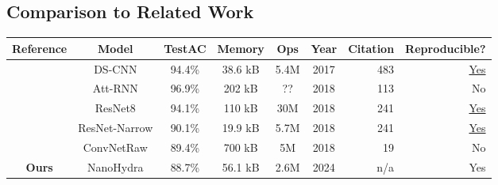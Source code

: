 \subsection{Comparison to Related Work}
\begin{table}
\begin{tabular}{||c|c|c|c|c|c|r|r||}
    \hline
    Reference & Model & TestAC & Memory & Ops & Year & Citation & Reproducible? \\

    \hline\hline
    \cite{Zhang2017}   &        DS-CNN & 94.4\% & 38.6 kB & 5.4M & 2017 & 483 &  \href{https://github.com/ARM-software/ML-KWS-for-MCU}{Yes} \\
    \cite{Andrade2018} &       Att-RNN & 96.9\% &  202 kB &   ?? & 2018 & 113 &  No \\
    \cite{Tang2018}    &       ResNet8 & 94.1\% &  110 kB &  30M & 2018 & 241 &  \href{https://github.com/castorini/honk/}{Yes} \\
    \cite{Tang2018}    & ResNet-Narrow & 90.1\% & 19.9 kB & 5.7M & 2018 & 241 &  \href{https://github.com/castorini/honk/}{Yes} \\
    \cite{Jansson2018} &    ConvNetRaw & 89.4\% &  700 kB &   5M & 2018 &  19 &  No \\
    \textbf{Ours}      &     NanoHydra & 88.7\% & 56.1 kB & 2.6M & 2024 & n/a &  Yes \\
    \hline
\end{tabular}
\end{table}

%
